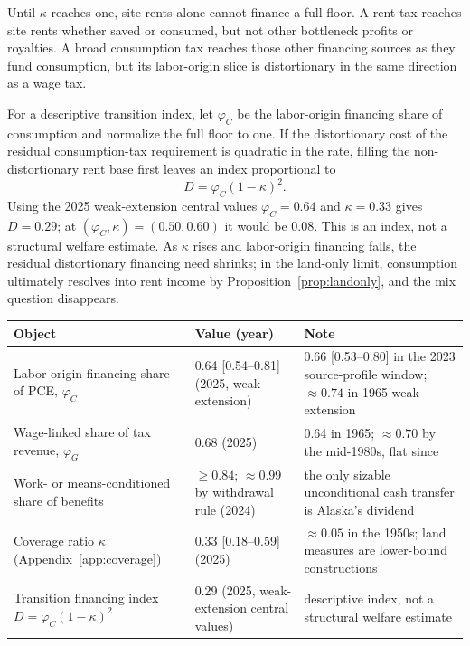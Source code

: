 \documentclass[12pt]{article}
\theoremstyle{plain}
\begin{document}
Until $\kappa$ reaches one, site rents alone cannot finance a full floor. A rent tax reaches site rents whether saved or consumed, but not other bottleneck profits or royalties. A broad consumption tax reaches those other financing sources as they fund consumption, but its labor-origin slice is distortionary in the same direction as a wage tax.

For a descriptive transition index, let $\varphi_C$ be the labor-origin financing share of consumption and normalize the full floor to one. If the distortionary cost of the residual consumption-tax requirement is quadratic in the rate, filling the non-distortionary rent base first leaves an index proportional to
\[
D=\varphi_C(1-\kappa)^2.
\]
Using the 2025 weak-extension central values $\varphi_C=0.64$ and $\kappa=0.33$ gives $D=0.29$; at $(\varphi_C,\kappa)=(0.50,0.60)$ it would be 0.08. This is an index, not a structural welfare estimate. As $\kappa$ rises and labor-origin financing falls, the residual distortionary financing need shrinks; in the land-only limit, consumption ultimately resolves into rent income by Proposition~\ref{prop:landonly}, and the mix question disappears.

\begin{center}
{\small
\begin{tabular}{p{5.4cm} p{3.5cm} p{4.8cm}}
\toprule
Object & Value (year) & Note \\
\midrule
Labor-origin financing share of PCE, $\varphi_C$ & 0.64 [0.54--0.81] (2025, weak extension) & 0.66 [0.53--0.80] in the 2023 source-profile window; $\approx 0.74$ in 1965 weak extension \\
Wage-linked share of tax revenue, $\varphi_G$ & 0.68 (2025) & 0.64 in 1965; $\approx 0.70$ by the mid-1980s, flat since \\
Work- or means-conditioned share of benefits & $\ge 0.84$; $\approx 0.99$ by withdrawal rule (2024) & the only sizable unconditional cash transfer is Alaska's dividend \\
Coverage ratio $\kappa$ (Appendix~\ref{app:coverage}) & 0.33 [0.18--0.59] (2025) & $\approx 0.05$ in the 1950s; land measures are lower-bound constructions \\
Transition financing index $D=\varphi_C(1-\kappa)^2$ & 0.29 (2025, weak-extension central values) & descriptive index, not a structural welfare estimate \\
\bottomrule
\end{tabular}
}
\end{center}
\end{document}

